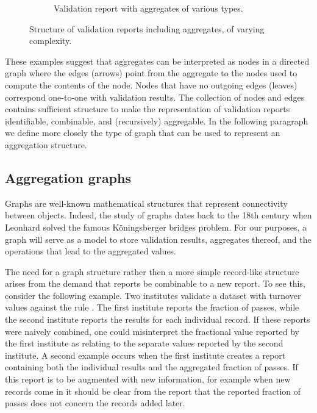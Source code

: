 \begin{figure}[!t]
\begin{subfigure}[b]{0.7\textwidth}
    \caption{Validation report with aggregates of various types.}
    \label{fig:graph3}
  \end{subfigure}
  \caption{Structure of validation reports including aggregates, of varying complexity.}
  \label{fig:graphs}
\end{figure}

These examples suggest that aggregates can be interpreted as nodes in a
directed graph where the edges (arrows) point from the aggregate to the nodes
used to compute the contents of the node. Nodes that have no outgoing edges
(leaves) correspond one-to-one with validation results.  The collection of
nodes and edges contains sufficient structure to make the representation of
validation reports identifiable, combinable, and (recursively) aggregable. In
the following paragraph we define more closely the type of graph that can be
used to represent an aggregation structure.


\subsection{Aggregation graphs}
\label{sect:aggregationgraphs}
Graphs are well-known mathematical structures that represent connectivity
between objects. Indeed, the  study of graphs dates back to the 18th century
when Leonhard \citet{euler1741solutio} solved the famous K\"oningsberger
bridges problem.  For our purposes, a graph will serve as a model to store
validation results, aggregates thereof, and the operations that lead to the
aggregated values.

The need for a graph structure rather then a more simple record-like structure
arises from the demand that reports be combinable to a new report.  To see
this, consider the following example. Two institutes validate a dataset with
turnover values against the rule . The first institute
reports the fraction of passes, while the second institute reports the results
for each individual record. If these reports were naively combined, one could
misinterpret the fractional value reported by the first institute as relating
to the separate values reported by the second institute. A second example
occurs when the first institute creates a report containing both the individual
results and the aggregated fraction of passes. If this report is to be
augmented with new information, for example when new records come in it should
be clear from the report that the reported fraction of passes does not concern
the records added later.


